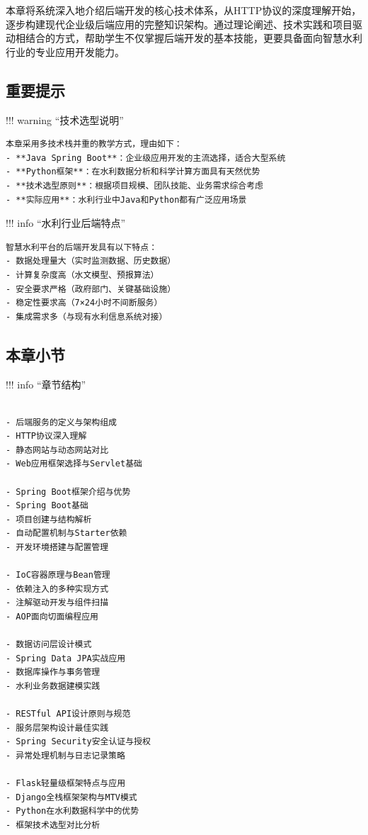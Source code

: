 本章将系统深入地介绍后端开发的核心技术体系，从HTTP协议的深度理解开始，逐步构建现代企业级后端应用的完整知识架构。通过理论阐述、技术实践和项目驱动相结合的方式，帮助学生不仅掌握后端开发的基本技能，更要具备面向智慧水利行业的专业应用开发能力。

\subsection{重要提示}\label{ux91cdux8981ux63d0ux793a}

!!! warning ``技术选型说明''

\begin{verbatim}
本章采用多技术栈并重的教学方式，理由如下：
- **Java Spring Boot**：企业级应用开发的主流选择，适合大型系统
- **Python框架**：在水利数据分析和科学计算方面具有天然优势
- **技术选型原则**：根据项目规模、团队技能、业务需求综合考虑
- **实际应用**：水利行业中Java和Python都有广泛应用场景
\end{verbatim}

!!! info ``水利行业后端特点''

\begin{verbatim}
智慧水利平台的后端开发具有以下特点：
- 数据处理量大（实时监测数据、历史数据）
- 计算复杂度高（水文模型、预报算法）
- 安全要求严格（政府部门、关键基础设施）
- 稳定性要求高（7×24小时不间断服务）
- 集成需求多（与现有水利信息系统对接）
\end{verbatim}

\subsection{本章小节}\label{ux672cux7ae0ux5c0fux8282}

!!! info ``章节结构''

\begin{verbatim}

- 后端服务的定义与架构组成
- HTTP协议深入理解
- 静态网站与动态网站对比
- Web应用框架选择与Servlet基础

- Spring Boot框架介绍与优势
- Spring Boot基础
- 项目创建与结构解析
- 自动配置机制与Starter依赖
- 开发环境搭建与配置管理

- IoC容器原理与Bean管理
- 依赖注入的多种实现方式
- 注解驱动开发与组件扫描
- AOP面向切面编程应用

- 数据访问层设计模式
- Spring Data JPA实战应用
- 数据库操作与事务管理
- 水利业务数据建模实践

- RESTful API设计原则与规范
- 服务层架构设计最佳实践
- Spring Security安全认证与授权
- 异常处理机制与日志记录策略

- Flask轻量级框架特点与应用
- Django全栈框架架构与MTV模式
- Python在水利数据科学中的优势
- 框架技术选型对比分析
\end{verbatim}


